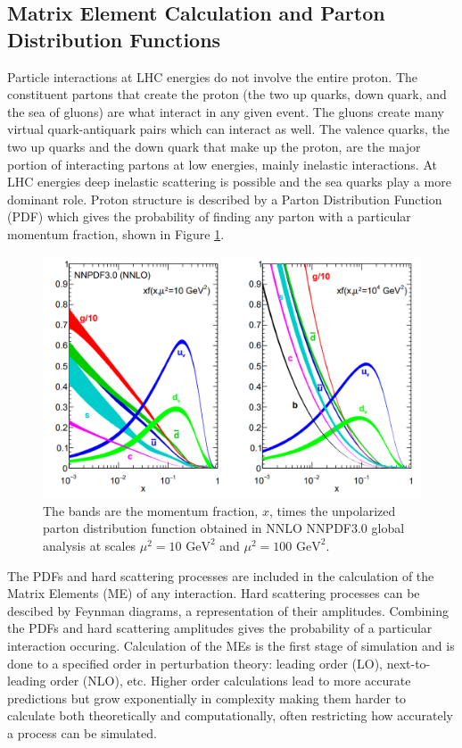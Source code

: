 \subsection{ Matrix Element Calculation and Parton Distribution Functions}

Particle interactions at LHC energies do not involve the entire proton.  The constituent partons that create the proton (the two up quarks, down quark, and the sea of gluons) are what interact in any given event.  The gluons create many virtual quark-antiquark pairs which can interact as well.  The valence quarks, the two up quarks and the down quark that make up the proton, are the major portion of interacting partons at low energies, mainly inelastic interactions.  At LHC energies deep inelastic scattering is possible and the sea quarks play a more dominant role.  Proton structure is described by a Parton Distribution Function (PDF) which gives the probability of finding any parton with a particular momentum fraction, shown in Figure \ref{fig:PDF}.

\begin{figure}[h!]
	\centering
	\includegraphics[width=\columnwidth]{../ThesisImages/Simulation/PDF.png}
	\caption[The bands are the momentum fraction, $x$, times the unpolarized parton distribution function obtained in NNLO NNPDF3.0 global analysis at scales $\mu^2= 10$ GeV and $\mu^2 = 100 \text{ GeV}^2$.]{The bands are the momentum fraction, $x$, times the unpolarized parton distribution function obtained in NNLO NNPDF3.0 global analysis at scales $\mu^2= 10 \text{ GeV}^2$ and $\mu^2 = 100 \text{ GeV}^2$\cite{PDG2018}.
	}
	\label{fig:PDF}
\end{figure}
The PDFs and hard scattering processes are included in the calculation of the Matrix Elements (ME) of any interaction.  Hard scattering processes can be descibed by Feynman diagrams, a representation of their amplitudes.  Combining the PDFs and hard scattering amplitudes gives the probability of a particular interaction occuring.  Calculation of the MEs is the first stage of simulation and is done to a specified order in perturbation theory: leading order (LO), next-to-leading order (NLO), etc.  Higher order calculations lead to more accurate predictions but grow exponentially in complexity making them harder to calculate both theoretically and computationally, often restricting how accurately a process can be simulated.  

